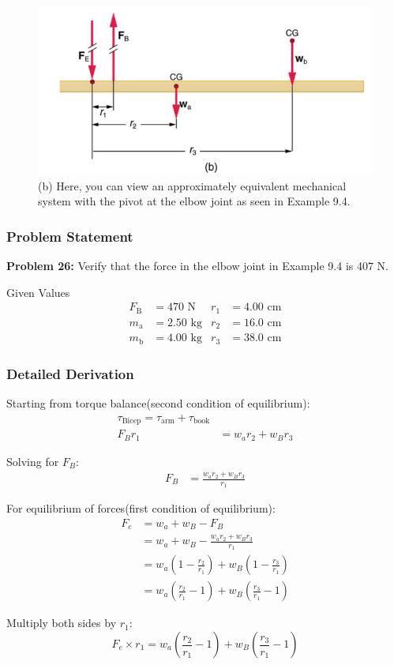 \documentclass{beamer}
\begin{document}
\begin{frame}
\begin{figure}
    \centering
    \includegraphics[width=0.7\linewidth]{CH9/Screenshot 2024-11-04 122703.png}
    \caption{ (b) Here, you can view an approximately equivalent mechanical system with the pivot at the elbow joint as seen in Example 9.4.}
\end{figure}
\end{frame}

\begin{frame}
\frametitle{Problem Statement}
\textbf{Problem 26:} Verify that the force in the elbow joint in Example 9.4 is 407 N.

\begin{block}{Given Values}
\begin{align*}
F_{\text{B}} &= 470 \text{ N} & r_1 &= 4.00 \text{ cm} \\
m_{\text{a}} &= 2.50 \text{ kg} & r_2 &= 16.0 \text{ cm} \\
m_{\text{b}} &= 4.00 \text{ kg} & r_3 &= 38.0 \text{ cm}
\end{align*}
\end{block}
\end{frame}


\begin{frame}
\frametitle{Detailed Derivation}

Starting from torque balance(second condition of equilibrium):
\begin{align*}
\tau_{\text{Bicep}}=\tau_{\text{arm}}+\tau_{\text{book}} \\
F_B r_1 &= w_a r_2 + w_B r_3
\end{align*}

Solving for $F_B$:
\begin{align*}
F_B &= \frac{w_a r_2 + w_B r_3}{r_1}
\end{align*}

For equilibrium of forces(first condition of equilibrium):
\begin{align*}
F_e &= w_a + w_B - F_B \\
&= w_a + w_B - \frac{w_a r_2 + w_B r_3}{r_1} \\
&= w_a\left(1 - \frac{r_2}{r_1}\right) + w_B\left(1 - \frac{r_3}{r_1}\right) \\
&= w_a\left(\frac{r_2}{r_1} - 1\right) + w_B\left(\frac{r_3}{r_1} - 1\right)
\end{align*}
\end{frame}
\begin{frame}
Multiply both sides by $r_1$:
\begin{equation*}
F_e \times r_1 = w_a\left(\frac{r_2}{r_1} - 1\right) + w_B\left(\frac{r_3}{r_1} - 1\right)
\end{equation*}
\end{frame}
\end{document}
